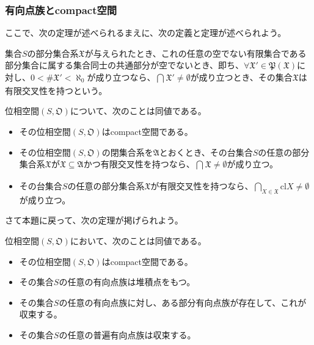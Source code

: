 \documentclass[dvipdfmx]{jsarticle}
\begin{document}
\subsubsection{有向点族とcompact空間}%
ここで、次の定理が述べられるまえに、次の定義と定理が述べられよう。
\begin{dfn*}
集合$S$の部分集合系$\mathfrak{X}$が与えられたとき、これの任意の空でない有限集合である部分集合に属する集合同士の共通部分が空でないとき、即ち、$\forall\mathfrak{X}'\in \mathfrak{P}\left( \mathfrak{X} \right)$に対し、$0 < {\#}\mathfrak{X}' < \aleph_{0}$が成り立つなら、$\bigcap_{} \mathfrak{X}' \neq \emptyset$が成り立つとき、その集合$\mathfrak{X}$は有限交叉性を持つという。
\end{dfn*}
\begin{thm*}
位相空間$\left( S,\mathfrak{O} \right)$について、次のことは同値である。
\begin{itemize}
\item
  その位相空間$\left( S,\mathfrak{O} \right)$はcompact空間である。
\item
  その位相空間$\left( S,\mathfrak{O} \right)$の閉集合系を$\mathfrak{A}$とおくとき、その台集合$S$の任意の部分集合系$\mathfrak{X}$が$\mathfrak{X \subseteq A}$かつ有限交叉性を持つなら、$\bigcap_{} \mathfrak{X} \neq \emptyset$が成り立つ。
\item
  その台集合$S$の任意の部分集合系$\mathfrak{X}$が有限交叉性を持つなら、$\bigcap_{X \in \mathfrak{X}} {{\mathrm{cl}}X} \neq \emptyset$が成り立つ。
\end{itemize}
\end{thm*}\par
さて本題に戻って、次の定理が掲げられよう。
\begin{thm}\label{8.1.9.12}
位相空間$\left( S,\mathfrak{O} \right)$において、次のことは同値である。
\begin{itemize}
\item
  その位相空間$\left( S,\mathfrak{O} \right)$はcompact空間である。
\item
  その集合$S$の任意の有向点族は堆積点をもつ。
\item
  その集合$S$の任意の有向点族に対し、ある部分有向点族が存在して、これが収束する。
\item
  その集合$S$の任意の普遍有向点族は収束する。
\end{itemize}
\end{thm}
\end{document}
